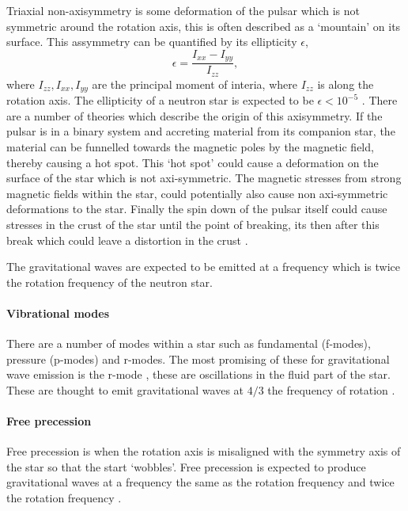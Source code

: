 Triaxial non-axisymmetry is some deformation of the pulsar which is not symmetric around the rotation axis, this is often described as a `mountain' on its surface.
This assymmetry can be quantified by its ellipticity $\epsilon$,
\begin{equation}
\label{ellipticity}
\epsilon = \frac{I_{xx}-I_{yy}}{I_{zz}},
\end{equation}
where $I_{zz},I_{xx},I_{yy}$ are the principal moment of interia, where $I_{zz}$ is along the rotation axis. 
The ellipticity of a neutron star is expected to be $ \epsilon<10^{-5}$ \cite{Becker2009}. 
There are a number of theories which describe the origin of this axisymmetry.
If the pulsar is in a binary system and accreting material from its companion star, the material can be funnelled towards the magnetic poles by the magnetic field, thereby causing a hot spot.
This `hot spot' could cause a deformation on the surface of the star which is not axi-symmetric. 
The magnetic stresses from strong magnetic fields within the star, could potentially also cause non axi-symmetric deformations to the star.
Finally the spin down of the pulsar itself could cause stresses in the crust of the star until the point of breaking, its then after this break which could leave a distortion in the crust \cite{Becker2009}.

The gravitational waves are expected to be emitted at a frequency which is twice the rotation frequency of the neutron star.
 
 \paragraph{Vibrational modes}
There are a number of modes within a star such as fundamental (f-modes), pressure (p-modes) and r-modes. 
The most promising of these for gravitational wave emission is the r-mode \cite{Becker2009}, these are oscillations in the fluid part of the star. 
These are thought to emit gravitational waves at $4/3$ the frequency of rotation \cite{Becker2009}.


\paragraph{Free precession}
Free precession is when the rotation axis is misaligned with the symmetry axis of the star so that the start `wobbles'. 
Free precession is expected to produce gravitational waves at a frequency the same as the rotation frequency and twice the rotation frequency \cite{Becker2009}. 


